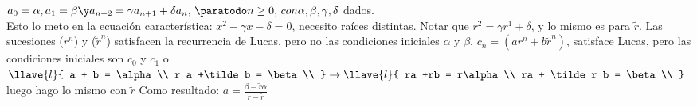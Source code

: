 $a_0 = \alpha, a_1 = \beta \y a_{n+2} = \gamma a_{n+1} +\delta a_n,\, \paratodo n \geq 0,\, con \alpha, \beta, \gamma, \delta $ dados.\\
Esto lo meto en la ecuación característica: $x^2 - \gamma x -\delta = 0$, necesito raíces distintas.
Notar que $r^2 = \gamma r^1 + \delta$, y lo mismo es para $\tilde r$. Las sucesiones ($r^n$) y ($\tilde r^n$) satisfacen la recurrencia de Lucas,
pero no las condiciones iniciales $\alpha$ y $\beta$.
$c_n = (a r^n + b \tilde r^n)$, satisface Lucas, pero las condiciones iniciales son $c_0$ y $c_1$ o
$
	\llave{l}{
		a + b = \alpha\\
		r a +\tilde b = \beta\\
	}\to
	\llave{l}{
		ra +rb = r\alpha\\
		ra + \tilde r b = \beta\\
	}
$ luego hago lo mismo con $\tilde r$
Como resultado: $a = \frac{\beta - \tilde r \alpha}{r - \tilde r}$

